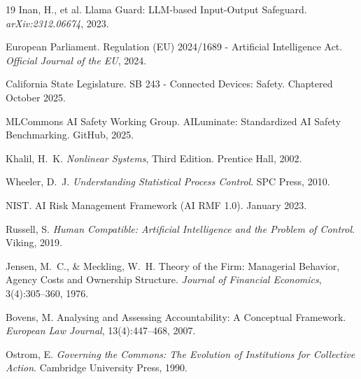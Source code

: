 \documentclass[11pt,twocolumn]{article}
\begin{document}
\begin{thebibliography}{19}
Inan, H., et al.
\newblock Llama Guard: LLM-based Input-Output Safeguard.
\newblock \emph{arXiv:2312.06674}, 2023.

European Parliament.
\newblock Regulation (EU) 2024/1689 - Artificial Intelligence Act.
\newblock \emph{Official Journal of the EU}, 2024.

California State Legislature.
\newblock SB 243 - Connected Devices: Safety.
\newblock Chaptered October 2025.

MLCommons AI Safety Working Group.
\newblock AILuminate: Standardized AI Safety Benchmarking.
\newblock GitHub, 2025.

Khalil, H.~K.
\newblock \emph{Nonlinear Systems}, Third Edition.
\newblock Prentice Hall, 2002.

Wheeler, D.~J.
\newblock \emph{Understanding Statistical Process Control}.
\newblock SPC Press, 2010.

NIST.
\newblock AI Risk Management Framework (AI RMF 1.0).
\newblock January 2023.

Russell, S.
\newblock \emph{Human Compatible: Artificial Intelligence and the Problem of Control}.
\newblock Viking, 2019.

Jensen, M.~C., \& Meckling, W.~H.
\newblock Theory of the Firm: Managerial Behavior, Agency Costs and Ownership Structure.
\newblock \emph{Journal of Financial Economics}, 3(4):305--360, 1976.

Bovens, M.
\newblock Analysing and Assessing Accountability: A Conceptual Framework.
\newblock \emph{European Law Journal}, 13(4):447--468, 2007.

Ostrom, E.
\newblock \emph{Governing the Commons: The Evolution of Institutions for Collective Action}.
\newblock Cambridge University Press, 1990.

\end{thebibliography}
\end{document}
